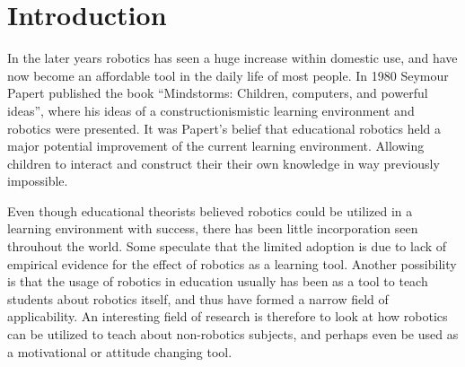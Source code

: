 \section*{Introduction}
In the later years robotics has seen a huge increase within domestic use, and have now become an affordable tool in the daily life of most people.
In 1980 Seymour Papert published the book "`Mindstorms: Children, computers, and powerful ideas"'\cite{papert1980mindstorms}, where his ideas of a constructionismistic 
learning environment and robotics were presented. It was Papert's belief that educational robotics held a major potential improvement of the current learning environment.
Allowing children to interact and construct their their own knowledge in way previously impossible. 

\bigskip\noindent
Even though educational theorists believed robotics could be utilized in a learning environment with success, there has been little
incorporation seen throuhout the world. 
Some speculate that the limited adoption is due to lack of empirical evidence for the effect of robotics as a learning tool\cite{williams2007acquisition}.  
Another possibility is that the usage of robotics in education usually has been as a tool to teach students about robotics itself, 
and thus have formed a narrow field of applicability. 
An interesting field of research is therefore to look at how robotics can be utilized to teach about non-robotics subjects, and perhaps even be used as a motivational or attitude changing tool. 